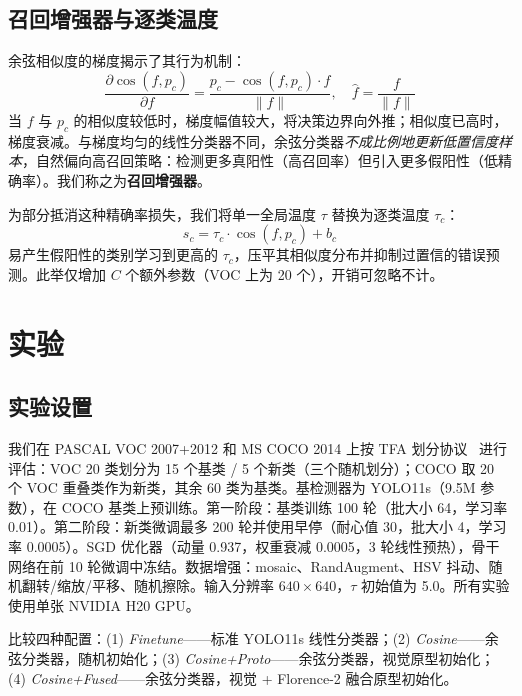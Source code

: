 \documentclass[conference]{IEEEtran}
\begin{document}
\subsection{召回增强器与逐类温度}

余弦相似度的梯度揭示了其行为机制：
\begin{equation}
\frac{\partial\cos(f,p_c)}{\partial f} = \frac{p_c - \cos(f,p_c)\cdot\hat{f}}{\|f\|}, \quad \hat{f}=\frac{f}{\|f\|}
\label{eq:gradient}
\end{equation}
当 $f$ 与 $p_c$ 的相似度较低时，梯度幅值较大，将决策边界向外推；相似度已高时，梯度衰减。与梯度均匀的线性分类器不同，余弦分类器\textit{不成比例地更新低置信度样本}，自然偏向高召回策略：检测更多真阳性（高召回率）但引入更多假阳性（低精确率）。我们称之为\textbf{召回增强器}。

为部分抵消这种精确率损失，我们将单一全局温度 $\tau$ 替换为逐类温度 $\tau_c$：
\begin{equation}
s_c = \tau_c \cdot \cos(f, p_c) + b_c
\label{eq:pertemp}
\end{equation}
易产生假阳性的类别学习到更高的 $\tau_c$，压平其相似度分布并抑制过置信的错误预测。此举仅增加 $C$ 个额外参数（VOC 上为 20 个），开销可忽略不计。

\section{实验}

\subsection{实验设置}

我们在 PASCAL VOC 2007+2012 和 MS COCO 2014 上按 TFA 划分协议~\cite{wang2020tfa} 进行评估：VOC 20 类划分为 15 个基类 / 5 个新类（三个随机划分）；COCO 取 20 个 VOC 重叠类作为新类，其余 60 类为基类。基检测器为 YOLO11s（9.5M 参数），在 COCO 基类上预训练。第一阶段：基类训练 100 轮（批大小 64，学习率 0.01）。第二阶段：新类微调最多 200 轮并使用早停（耐心值 30，批大小 4，学习率 0.0005）。SGD 优化器（动量 0.937，权重衰减 0.0005，3 轮线性预热），骨干网络在前 10 轮微调中冻结。数据增强：mosaic、RandAugment、HSV 抖动、随机翻转/缩放/平移、随机擦除。输入分辨率 $640\times640$，$\tau$ 初始值为 5.0。所有实验使用单张 NVIDIA H20 GPU。

比较四种配置：(1) \textit{Finetune}——标准 YOLO11s 线性分类器；(2) \textit{Cosine}——余弦分类器，随机初始化；(3) \textit{Cosine+Proto}——余弦分类器，视觉原型初始化；(4) \textit{Cosine+Fused}——余弦分类器，视觉 + Florence-2 融合原型初始化。
\end{document}
